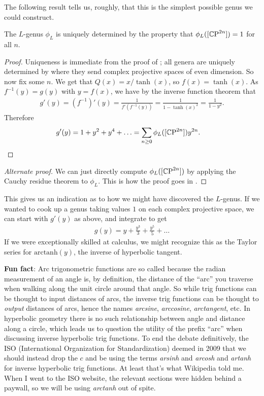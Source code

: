 \documentclass[11pt]{book}
\begin{document}
The following result tells us, roughly, that this is the simplest possible genus we could construct.

\begin{proposition}\label{prop:L-genus-CP2n-to-1} 
The $L$-genus $\phi_L$ is uniquely determined by the property that $\phi_L([{\mathbb{C}\text{P}}^{2n}]) = 1$ for all $n$.
\end{proposition}
\begin{proof} Uniqueness is immediate from the proof of ; all genera are uniquely determined by where they send complex projective spaces of even dimension. So now fix some $n$. We get that $Q(x) = x/\tanh(x)$, so $f(x) = \tanh(x)$. As $f^{-1}(y) = g(y)$ with $y=f(x)$, we have by the inverse function theorem that
\begin{align*}
    g'(y) = (f^{-1})'(y) = \frac{1}{f'(f^{-1}(y))} = \frac{1}{1-\tanh(x)^2} = \frac{1}{1-y^2}.
\end{align*}
Therefore
\begin{align*}
    g'(y) &= 1 + y^2 + y^4 + \ldots  = \sum_{n\ge0} \phi_L([{\mathbb{C}\text{P}}^{2n}]) y^{2n}.
\end{align*}
\end{proof}
\begin{proof}[Alternate proof] We can just directly compute $\phi_L([{\mathbb{C}\text{P}}^{2n}])$ by applying the Cauchy residue theorem to $\phi_L$. This is how the proof goes in \cite[1.5.1]{Hirzebruch}.
\end{proof}

\begin{remark} This gives us an indication as to how we might have discovered the $L$-genus. If we wanted to cook up a genus taking values $1$ on each complex projective space, we can start with $g'(y)$ as above, and integrate to get
\begin{align*}
    g(y) = y + \frac{y^3}{3} + \frac{y^5}{5} + \ldots 
\end{align*}
If we were exceptionally skilled at calculus, we might recognize this as the Taylor series for $\text{arctanh}(y)$, the inverse of hyperbolic tangent.
\end{remark}

\textbf{Fun fact}: Arc trigonometric functions are so called because the radian measurement of an angle is, by definition, the distance of the ``arc'' you traverse when walking along the unit circle around that angle. So while trig functions can be thought to input distances of arcs, the inverse trig functions can be thought to \emph{output} distances of arcs, hence the names \emph{arcsine}, \emph{arccosine}, \emph{arctangent}, etc. In hyperbolic geometry there is no such relationship between angle and distance along a circle, which leads us to question the utility of the prefix ``arc'' when discussing inverse hyperbolic trig functions. To end the debate definitively, the ISO (International Organization for Standardization) deemed in 2009 that we should instead drop the $c$ and be using the terms \emph{arsinh} and \emph{arcosh} and \emph{artanh} for inverse hyperbolic trig functions. At least that's what Wikipedia told me. When I went to the ISO website, the relevant sections were hidden behind a paywall, so we will be using \emph{arctanh} out of spite.
\end{document}
